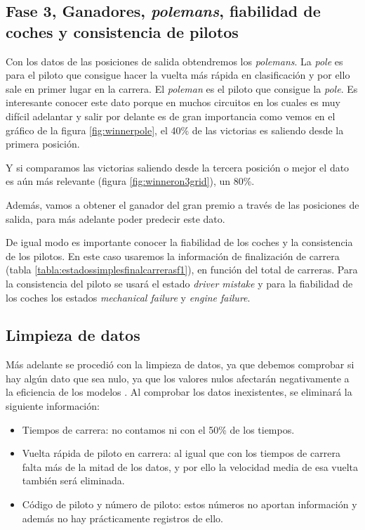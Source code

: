 \subsection{Fase 3, Ganadores, \textit{polemans}, fiabilidad de coches y consistencia de pilotos}
Con los datos de las posiciones de salida obtendremos los \textit{polemans}. La \textit{pole} es para el piloto que consigue hacer la vuelta más rápida en clasificación y por ello sale en primer lugar en la carrera. El \textit{poleman} es el piloto que consigue la \textit{pole}. Es interesante conocer este dato porque en muchos circuitos en los cuales es muy difícil adelantar y salir por delante es de gran importancia como vemos en el gráfico de la figura \ref{fig:winnerpole}, el 40\% de las victorias es saliendo desde la primera posición.


Y si comparamos las victorias saliendo desde la tercera posición o mejor el dato es aún más relevante (figura \ref{fig:winneron3grid}), un 80\%.


Además, vamos a obtener el ganador del gran premio a través de las posiciones de salida, para más adelante poder predecir este dato.

De igual modo es importante conocer la fiabilidad de los coches y la consistencia de los pilotos. En este caso usaremos la información de finalización de carrera (tabla \ref{tabla:estadossimplesfinalcarrerasf1}), en función del total de carreras. Para la consistencia del piloto se usará el estado \textit{driver mistake} y para la fiabilidad de los coches los estados \textit{mechanical failure} y \textit{engine failure}.

\subsection{Limpieza de datos}

Más adelante se procedió con la limpieza de datos, ya que debemos comprobar si hay algún dato que sea nulo, ya que los valores nulos afectarán negativamente a la eficiencia de los modelos \cite{art:impactmissdata}. 
Al comprobar los datos inexistentes, se eliminará la siguiente información: 

\begin{itemize}
	\item Tiempos de carrera: no contamos ni con el 50\% de los tiempos.
	\item Vuelta rápida de piloto en carrera: al igual que con los tiempos de carrera falta más de la mitad de los datos, y por ello la velocidad media de esa vuelta también será eliminada.
    \item Código de piloto y número de piloto: estos números no aportan información y además no hay prácticamente registros de ello.
\end{itemize} 

